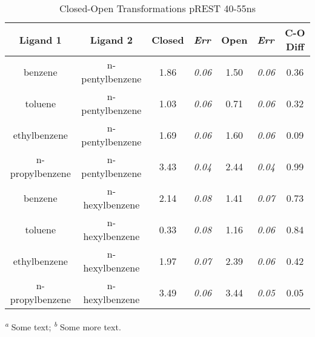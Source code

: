 \documentclass[T4paper.tex]{subfiles}
\begin{document}
\begin{table}[!htb]
\centering
\caption{Closed-Open Transformations pREST 40-55ns}
\label{tbl:C-O_pREST-40-55ns}
\begin{tabular}{|c|c|c|l|c|l|c|}
\hline
\textbf{Ligand 1}                       & \textbf{Ligand 2}                       & {\color[HTML]{800080} \textbf{Closed}} & {\color[HTML]{800080} \textit{Err}} & {\color[HTML]{008000} \textbf{Open}} & {\color[HTML]{008000} \textit{Err}} & \textbf{C-O Diff}            \\ \hline
\cellcolor[HTML]{800080}benzene         & \cellcolor[HTML]{008000}n-pentylbenzene & 1.86                                   & \textit{0.06}                       & 1.50                                & \textit{0.06}                       & \cellcolor[HTML]{FFCCC9}0.36 \\ \hline
\cellcolor[HTML]{800080}toluene         & \cellcolor[HTML]{008000}n-pentylbenzene & 1.03                                   & \textit{0.06}                       & 0.71                                 & \textit{0.06}                       & \cellcolor[HTML]{FFCCC9}0.32 \\ \hline
\cellcolor[HTML]{800080}ethylbenzene    & \cellcolor[HTML]{008000}n-pentylbenzene & 1.69                                   & \textit{0.06}                       & 1.60                                 & \textit{0.06}                       & \cellcolor[HTML]{FFCCC9}0.09 \\ \hline
\cellcolor[HTML]{800080}n-propylbenzene & \cellcolor[HTML]{008000}n-pentylbenzene & 3.43                                   & \textit{0.04}                       & 2.44                                & \textit{0.04}                       & \cellcolor[HTML]{FFCCC9}0.99 \\ \hline
\cellcolor[HTML]{800080}benzene         & \cellcolor[HTML]{008000}n-hexylbenzene  & 2.14                                   & \textit{0.08}                       & 1.41                                & \textit{0.07}                       & \cellcolor[HTML]{FFCCC9}0.73 \\ \hline
\cellcolor[HTML]{800080}toluene         & \cellcolor[HTML]{008000}n-hexylbenzene  & 0.33                                   & \textit{0.08}                       & 1.16                                & \textit{0.06}                       & \cellcolor[HTML]{FFCCC9}0.84 \\ \hline
\cellcolor[HTML]{800080}ethylbenzene    & \cellcolor[HTML]{008000}n-hexylbenzene  & 1.97                                   & \textit{0.07}                       & 2.39                                & \textit{0.06}                       & \cellcolor[HTML]{FFCCC9}0.42 \\ \hline
\cellcolor[HTML]{800080}n-propylbenzene & \cellcolor[HTML]{008000}n-hexylbenzene  & 3.49                                   & \textit{0.06}                       & 3.44                                 & \textit{0.05}                       & \cellcolor[HTML]{FFCCC9}0.05 \\ \hline
\end{tabular}

  \textsuperscript{\emph{a}} Some text;
  \textsuperscript{\emph{b}} Some more text.
\end{table}
\end{document}
